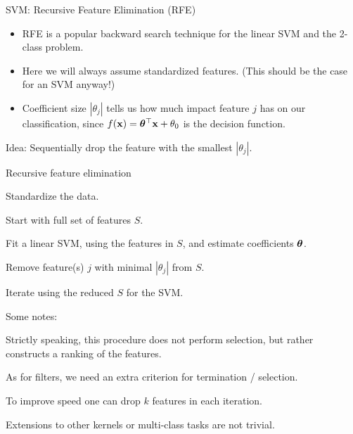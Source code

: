 \documentclass[11pt,compress,t,notes=noshow, xcolor=table]{beamer}
\begin{document}
  \begin{vbframe}{SVM: Recursive Feature Elimination (RFE)}
    \begin{itemize}
      \item RFE is a popular backward search technique for the linear SVM and the 2-class problem.
      \item Here we will always assume standardized features. (This should be the case for an SVM anyway!)
      \item Coefficient size $|\theta_j|$ tells us how much impact feature $j$ has on our classification,
      since $f(\mathbf{x}) = \bm{\theta}^\top \mathbf{x} + \theta_0$ is the decision function.
    \end{itemize}

    Idea: Sequentially drop the feature with the smallest $|\theta_j|$.

    \framebreak

    \begin{blocki}{Recursive feature elimination}
      \item Standardize the data.
      \item Start with full set of features $S$.
      \item Fit a linear SVM, using the features in $S$, and estimate coefficients $\bm{\theta}$.
      \item Remove feature(s) $j$ with minimal $|\theta_j|$ from $S$.
      \item Iterate  using the reduced $S$ for the SVM.
    \end{blocki}

    \framebreak

    \begin{blocki}{Some notes:}
      \item Strictly speaking, this procedure does not perform selection, but rather constructs a ranking of the features.
      \item As for filters, we need an extra criterion for termination / selection.
      \item To improve speed one can drop $k$ features in each iteration.
      \item Extensions to other kernels or multi-class tasks are not trivial.
    \end{blocki}

  \end{vbframe}
\end{document}
